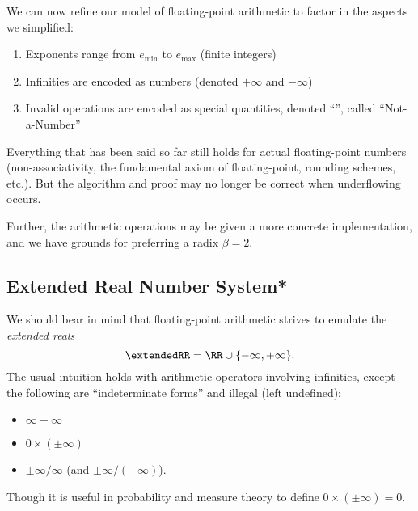 We can now refine our model of floating-point arithmetic to factor in
the aspects we simplified:
\begin{enumerate}
\item Exponents range from $e_{\text{min}}$ to $e_{\text{max}}$ (finite integers)
\item Infinities are encoded as numbers (denoted $+\infty$ and $-\infty$)
\item Invalid operations are encoded as special quantities, denoted
  ``\NaN'', called ``Not-a-Number''
\end{enumerate}
Everything that has been said so far still holds for actual 
floating-point numbers (non-associativity, the fundamental axiom of
floating-point, rounding schemes, etc.). But the algorithm and proof may
no longer be correct when underflowing occurs.

Further, the arithmetic operations may be given a more concrete
implementation, and we have grounds for preferring a radix $\beta=2$.

\subsection{Extended Real Number System*}\label{subsec:computer:extended-real-number-system}

We should bear in mind that  floating-point arithmetic strives
to emulate the \emph{extended reals}
\begin{equation}
  \extendedRR = \RR\cup\{-\infty,+\infty\}.
\end{equation}
The usual intuition holds with arithmetic operators involving
infinities, except the following are ``indeterminate forms'' and illegal
(left undefined):
\begin{itemize}
\item $\infty-\infty$
\item $0\times(\pm\infty)$
\item $\pm\infty/\infty$ (and $\pm\infty/(-\infty)$).
\end{itemize}
Though it is useful in probability and measure theory to define
$0\times(\pm\infty)=0$.

